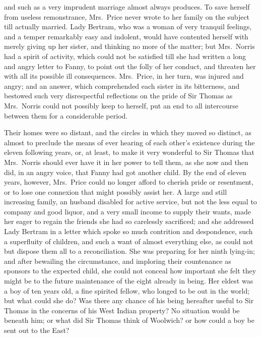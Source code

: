 \documentclass{article}
\begin{document}
and such as a very imprudent marriage almost always produces.
To save herself from useless remonstrance, Mrs.\ Price never
wrote to her family on the subject till actually married.
Lady Bertram, who was a woman of very tranquil feelings,
and a temper remarkably easy and indolent, would have
contented herself with merely giving up her sister,
and thinking no more of the matter; but Mrs.\ Norris
had a spirit of activity, which could not be satisfied
till she had written a long and angry letter to Fanny,
to point out the folly of her conduct, and threaten
her with all its possible ill consequences.  Mrs.\ Price,
in her turn, was injured and angry; and an answer,
which comprehended each sister in its bitterness, and bestowed
such very disrespectful reflections on the pride of Sir
Thomas as Mrs.\ Norris could not possibly keep to herself,
put an end to all intercourse between them for a considerable
period.

Their homes were so distant, and the circles in which they
moved so distinct, as almost to preclude the means of ever
hearing of each other's existence during the eleven
following years, or, at least, to make it very wonderful
to Sir Thomas that Mrs.\ Norris should ever have it
in her power to tell them, as she now and then did,
in an angry voice, that Fanny had got another child.
By the end of eleven years, however, Mrs.\ Price could no
longer afford to cherish pride or resentment, or to lose one
connexion that might possibly assist her.  A large and still
increasing family, an husband disabled for active service,
but not the less equal to company and good liquor, and a
very small income to supply their wants, made her eager
to regain the friends she had so carelessly sacrificed;
and she addressed Lady Bertram in a letter which spoke
so much contrition and despondence, such a superfluity
of children, and such a want of almost everything else,
as could not but dispose them all to a reconciliation.
She was preparing for her ninth lying-in; and after
bewailing the circumstance, and imploring their countenance
as sponsors to the expected child, she could not conceal
how important she felt they might be to the future
maintenance of the eight already in being.  Her eldest
was a boy of ten years old, a fine spirited fellow,
who longed to be out in the world; but what could she do?
Was there any chance of his being hereafter useful to Sir
Thomas in the concerns of his West Indian property?
No situation would be beneath him; or what did Sir Thomas
think of Woolwich? or how could a boy be sent out to
the East?
\end{document}
